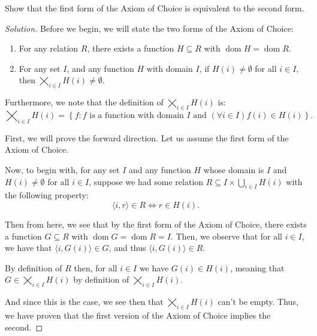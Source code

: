 \documentclass{article}
\newenvironment{solution}{\begin{proof}[Solution]}{\end{proof}}
\renewcommand\qedsymbol{$\blacksquare$}
\newenvironment{innerproof}{\renewcommand{\qedsymbol}{$\square$}\proof}{\endproof}
\DeclareMathOperator*{\dom}{\mathrm{dom}}
\newcommand{\brc}[1]{ \left\{  {#1} \right\}}
\newcommand{\ang}[1]{\langle {#1} \rangle}
\begin{document}
	\begin{hw}{31}
		Show that the first form of the Axiom of Choice is equivalent to the second form.
	\end{hw}
	\begin{solution}
		Before we begin, we will state the two forms of the Axiom of Choice:
		\begin{enumerate}
			\item For any relation $R$, there exists a function $H \subseteq R$ with $\dom H = \dom R$.
			\item For any set $I$, and any function $H$ with domain $I$, if $H(i) \neq \emptyset$ for all $i \in I$, then $\bigtimes_{i \in I} H(i) \neq \emptyset$.
		\end{enumerate}
	
		Furthermore, we note that the definition of $\bigtimes_{i \in I} H(i)$ is:
		\begin{equation*}
			\bigtimes_{i \in I} H(i) = \brc{f : f\text{ is a function with domain $I$ and } (\forall i \in I)f(i) \in H(i)}.
		\end{equation*}
		
		First, we will prove the forward direction.
		\begin{innerproof}
			Let us assume the first form of the Axiom of Choice.
			
			Now, to begin with, for any set $I$ and any function $H$ whose domain is $I$ and $H(i) \neq \emptyset$ for all $i \in I$, suppose we had some relation $R \subseteq I \times \bigcup_{i \in I} H(i)$ with the following property:
			\begin{equation*}
				\ang{i, r} \in R \iff r \in H(i).
			\end{equation*}
			
			Then from here, we see that by the first form of the Axiom of Choice, there exists a function $G \subseteq R$ with $\dom G = \dom R = I$. Then, we observe that for all $i \in I$, we have that $\ang{i, G(i)} \in G$, and thus $\ang{i, G(i)} \in R$. 
			
			By definition of $R$ then, for all $i \in I$ we have $G(i) \in H(i)$, meaning that $G \in \bigtimes_{i \in I} H(i)$ by definition of $\bigtimes_{i \in I} H(i)$.
			
			And since this is the case, we see then that $\bigtimes_{i \in I} H(i)$ can't be empty. Thus, we have proven that the first version of the Axiom of Choice implies the second.
		\end{innerproof}
	

\end{solution}
\end{document}
